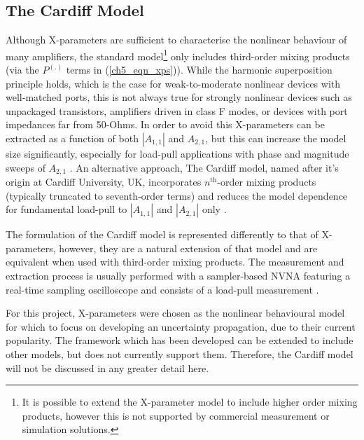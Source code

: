 \documentclass[../thesis/thesis.tex]{subfiles}
\begin{document}
\subsection{The Cardiff Model}

Although X-parameters are sufficient to characterise the nonlinear behaviour of many amplifiers, the standard model\footnote{It is possible to extend the X-parameter model to include higher order mixing products, however this is not supported by commercial measurement or simulation solutions.} only includes third-order mixing products (via the $P^{(.)}$ terms in (\ref{ch5_eqn_xps})). While the harmonic superposition principle holds, which is the case for weak-to-moderate nonlinear devices with well-matched ports, this is not always true for strongly nonlinear devices such as unpackaged transistors, amplifiers driven in class F modes, or devices with port impedances far from 50-Ohms. In order to avoid this X-parameters can be extracted as a function of both $|A_{1,1}|$ and $A_{2,1}$, but this can increase the model size significantly, especially for load-pull applications with phase and magnitude sweeps of $A_{2,1}$ \cite{Gunyan_2009}. An alternative approach,  The Cardiff model, named after it's origin at Cardiff University, UK, incorporates $n^{\textrm{th}}$-order mixing products (typically truncated to seventh-order terms) and reduces the model dependence for fundamental load-pull to $|A_{1,1}|$ and $|A_{2,1}|$ only \cite{Woodington_2008,Qi_2009}.

The formulation of the Cardiff model is represented differently to that of X-parameters, however, they are a natural extension of that model and are equivalent when used with third-order mixing products. The measurement and extraction process is usually performed with a sampler-based NVNA featuring a real-time sampling oscilloscope and consists of a load-pull measurement \cite{Woodington_2010}.

For this project, X-parameters were chosen as the nonlinear behavioural model for which to focus on developing an uncertainty propagation, due to their current popularity. The framework which has been developed can be extended to include other models, but does not currently support them. Therefore, the Cardiff model will not be discussed in any greater detail here.
\end{document}
